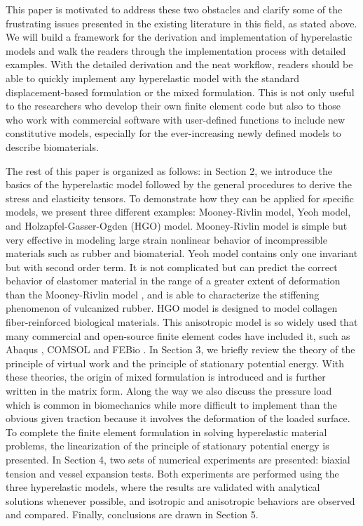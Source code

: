 This paper is motivated to address these two obstacles and clarify some of the frustrating issues presented in the existing literature in this field, as stated above. We will build a framework for the derivation and implementation of hyperelastic models and walk the readers through the implementation process with detailed examples. With the detailed derivation and the neat workflow, readers should be able to quickly implement any hyperelastic model with the standard displacement-based formulation or the mixed formulation. This is not only useful to the researchers who develop their own finite element code but also to those who work with commercial software with user-defined functions to include new constitutive models, especially for the ever-increasing newly defined models to describe biomaterials.

The rest of this paper is organized as follows: in Section 2, we introduce the basics of the hyperelastic model followed by the general procedures to derive the stress and elasticity tensors. To demonstrate how they can be applied for specific models, we present three different examples: Mooney-Rivlin model, Yeoh model, and Holzapfel-Gasser-Ogden (HGO) model. Mooney-Rivlin model is simple but very effective in modeling large strain nonlinear behavior of incompressible materials such as rubber and biomaterial. Yeoh model contains only one invariant but with second order term. It is not complicated but can predict the correct behavior of elastomer material in the range of a greater extent of deformation than the Mooney-Rivlin model \cite{Gajewski}, and is able to characterize the stiffening phenomenon of vulcanized rubber. HGO model is designed to model collagen fiber-reinforced biological materials. This anisotropic model is so widely used that many commercial and open-source finite element codes have included it,  such as Abaqus \cite{Abaqus}, COMSOL \cite{COMSOL} and FEBio \cite{FEBio}. In Section 3, we briefly review the theory of the principle of virtual work and the principle of stationary potential energy. With these theories, the origin of mixed formulation is introduced and is further written in the matrix form. Along the way we also discuss the pressure load which is common in biomechanics while more difficult to implement than the obvious given traction because it involves the deformation of the loaded surface. To complete the finite element formulation in solving hyperelastic material problems, the linearization of the principle of stationary potential energy is presented. In Section 4, two sets of numerical experiments are presented: biaxial tension and vessel expansion tests. Both experiments are performed using the three hyperelastic models, where the results are validated with analytical solutions whenever possible, and isotropic and anisotropic behaviors are observed and compared. Finally, conclusions are drawn in Section 5.




 




